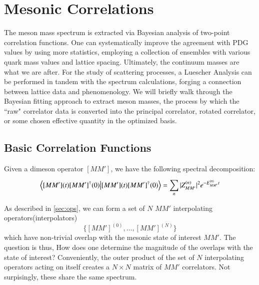
\chapter{Mesonic Correlations}
\label{sec:signal}

The meson mass spectrum is extracted via Bayesian analysis of two-point correlation functions. One can systematically improve the agreement with PDG values by using more statistics, employing a collection of ensembles with various quark mass values and lattice spacing. Ultimately, the continuum masses are what we are after. For the study of scattering processes, a Luescher Analysis can be performed in tandem with the spectrum calculations, forging a connection between lattice data and phenomenology. We will briefly walk through the Bayesian fitting approach to extract meson masses, the process by which the ``raw" correlator data is converted into the principal correlator, rotated correlator, or some chosen effective quantity in the optimized basis. 

\section{Basic Correlation Functions}
Given a dimeson operator $[MM']$, we have the following spectral decomposition: 
\begin{align}
    \braket{[MM'](t) [MM']^\dagger(0)} = \sum_{n}^{} |Z_{MM'}^{(n)}|^2 e^{-E_{MM'}^{(n)}t}
\end{align}

As described in \ref{sec:ops}, we can form a set of $N$ $MM'$ interpolating operators(interpolators) $$\{[MM']^{(0)},\dots,[MM']^{(N)}\}$$ which have non-trivial overlap with the mesonic state of interest $MM'$. The question is thus, How does one determine the magnitude of the overlaps with the state of interest? Conveniently, the outer product of the set of $N$ interpolating operators acting on itself creates a $N \times N$ matrix of $MM'$ correlators. Not surpisingly, these share the same spectrum. 

